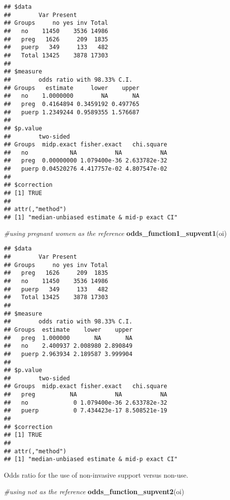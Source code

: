\documentclass[
]{article}
\newenvironment{Shaded}{\begin{snugshade}}{\end{snugshade}}
\newcommand{\CommentTok}[1]{\textcolor[rgb]{0.56,0.35,0.01}{\textit{#1}}}
\newcommand{\KeywordTok}[1]{\textcolor[rgb]{0.13,0.29,0.53}{\textbf{#1}}}
\newcommand{\NormalTok}[1]{#1}
\begin{document}
\begin{verbatim}
## $data
##        Var Present
## Groups     no yes inv Total
##   no    11450    3536 14986
##   preg   1626     209  1835
##   puerp   349     133   482
##   Total 13425    3878 17303
## 
## $measure
##        odds ratio with 98.33% C.I.
## Groups   estimate     lower    upper
##   no    1.0000000        NA       NA
##   preg  0.4164894 0.3459192 0.497765
##   puerp 1.2349244 0.9589355 1.576687
## 
## $p.value
##        two-sided
## Groups  midp.exact fisher.exact   chi.square
##   no            NA           NA           NA
##   preg  0.00000000 1.079400e-36 2.633782e-32
##   puerp 0.04520276 4.417757e-02 4.807547e-02
## 
## $correction
## [1] TRUE
## 
## attr(,"method")
## [1] "median-unbiased estimate & mid-p exact CI"
\end{verbatim}

\begin{Shaded}
\begin{Highlighting}[]
\CommentTok{#using pregnant women as the reference}
\KeywordTok{odds_function1_supvent1}\NormalTok{(oi)}
\end{Highlighting}
\end{Shaded}

\begin{verbatim}
## $data
##        Var Present
## Groups     no yes inv Total
##   preg   1626     209  1835
##   no    11450    3536 14986
##   puerp   349     133   482
##   Total 13425    3878 17303
## 
## $measure
##        odds ratio with 98.33% C.I.
## Groups  estimate    lower    upper
##   preg  1.000000       NA       NA
##   no    2.400937 2.008980 2.890849
##   puerp 2.963934 2.189587 3.999904
## 
## $p.value
##        two-sided
## Groups  midp.exact fisher.exact   chi.square
##   preg          NA           NA           NA
##   no             0 1.079400e-36 2.633782e-32
##   puerp          0 7.434423e-17 8.508521e-19
## 
## $correction
## [1] TRUE
## 
## attr(,"method")
## [1] "median-unbiased estimate & mid-p exact CI"
\end{verbatim}

Odds ratio for the use of non-invasive support versus non-use.

\begin{Shaded}
\begin{Highlighting}[]
\CommentTok{#using not as the reference}
\KeywordTok{odds_function_supvent2}\NormalTok{(oi)}
\end{Highlighting}
\end{Shaded}
\end{document}
